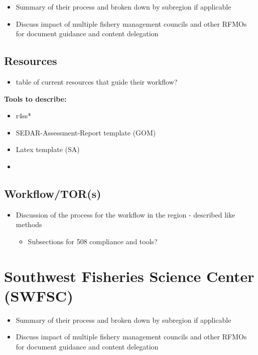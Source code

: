 \documentclass[
  letterpaper,
  oneside,
  open=any]{scrbook}
\providecommand{\tightlist}{%
  \setlength{\itemsep}{0pt}\setlength{\parskip}{0pt}}\usepackage{longtable,booktabs,array}
\begin{document}
\begin{itemize}
\item
  Summary of their process and broken down by subregion if applicable
\item
  Discuss impact of multiple fishery management councils and other RFMOs
  for document guidance and content delegation
\end{itemize}

\section{Resources}\label{resources-4}

\begin{itemize}
\tightlist
\item
  table of current resources that guide their workflow?
\end{itemize}

\textbf{Tools to describe:}

\begin{itemize}
\item
  r4ss*
\item
  SEDAR-Assessment-Report template (GOM)
\item
  Latex template (SA)
\item
\end{itemize}

\section{Workflow/TOR(s)}\label{workflowtors-1}

\begin{itemize}
\item
  Discussion of the process for the workflow in the region - described
  like methods

  \begin{itemize}
  \tightlist
  \item
    Subsections for 508 compliance and tools?
  \end{itemize}
\end{itemize}


\chapter{Southwest Fisheries Science Center
(SWFSC)}\label{southwest-fisheries-science-center-swfsc}

\begin{itemize}
\item
  Summary of their process and broken down by subregion if applicable
\item
  Discuss impact of multiple fishery management councils and other RFMOs
  for document guidance and content delegation
\end{itemize}
\end{document}
